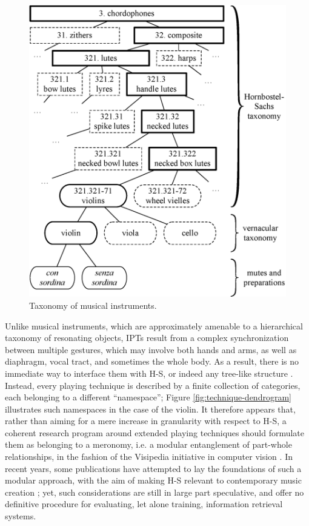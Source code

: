 \documentclass{article}
\makeatletter
\newcommand*{\ie}{i.e.\@\xspace}
\makeatother
\begin{document}
\begin{figure}[t!]
\centering
\includegraphics[width=\linewidth]{./figs/dendrograms/instrument-dendrogram.eps}
\caption{Taxonomy of musical instruments.}
\label{fig:instrument-dendrogram}
\end{figure}

Unlike musical instruments, which are approximately amenable to a hierarchical taxonomy of resonating objects, IPTs result from a complex synchronization between multiple gestures, which may involve both hands and arms, as well as diaphragm, vocal tract, and sometimes the whole body.
As a result, there is no immediate way to interface them with H-S, or indeed any tree-like structure \cite{kolozali2011ismir}.
Instead, every playing technique is described by a finite collection of categories, each belonging to a different ``namespace''; Figure \ref{fig:technique-dendrogram} illustrates such namespaces in the case of the violin.
It therefore appears that, rather than aiming for a mere increase in granularity with respect to H-S, a coherent research program around extended playing techniques should formulate them as belonging to a meronomy, \ie{} a modular entanglement of part-whole relationships, in the fashion of the Visipedia initiative in computer vision \cite{belongie2015pattern}.
In recent years, some publications have attempted to lay the foundations of such a modular approach, with the aim of making H-S relevant to contemporary music creation \cite{magnusson2017jnmr,weisser2011ytm}; yet, such considerations are still in large part speculative, and offer no definitive procedure for evaluating, let alone training, information retrieval systems.
\end{document}
